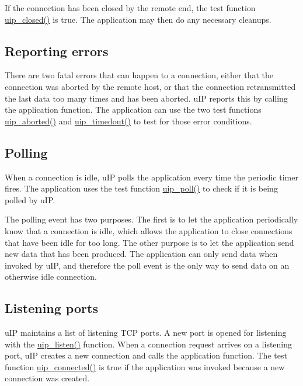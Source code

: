 If the connection has been closed by the remote end, the test function \hyperlink{a00064_gef6c4140c632b6a406779342cf3b6eb6}{uip\_\-closed()} is true. The application may then do any necessary cleanups.\hypertarget{main_errors}{}\subsection{Reporting errors}\label{main_errors}
There are two fatal errors that can happen to a connection, either that the connection was aborted by the remote host, or that the connection retransmitted the last data too many times and has been aborted. u\-IP reports this by calling the application function. The application can use the two test functions \hyperlink{a00064_gfbd5fc486dfdf6bf6fc9db52b1f418c4}{uip\_\-aborted()} and \hyperlink{a00064_g7b2ac4b18bd2ac3912fe67b3b17158c3}{uip\_\-timedout()} to test for those error conditions.\hypertarget{main_polling}{}\subsection{Polling}\label{main_polling}
When a connection is idle, u\-IP polls the application every time the periodic timer fires. The application uses the test function \hyperlink{a00064_g58bb90796c1cdad3aac2ecf44d87b20e}{uip\_\-poll()} to check if it is being polled by u\-IP.

The polling event has two purposes. The first is to let the application periodically know that a connection is idle, which allows the application to close connections that have been idle for too long. The other purpose is to let the application send new data that has been produced. The application can only send data when invoked by u\-IP, and therefore the poll event is the only way to send data on an otherwise idle connection.\hypertarget{main_listen}{}\subsection{Listening ports}\label{main_listen}
u\-IP maintains a list of listening TCP ports. A new port is opened for listening with the \hyperlink{a00064_gdd1ab3704ecd4900eec61a6897d32dc8}{uip\_\-listen()} function. When a connection request arrives on a listening port, u\-IP creates a new connection and calls the application function. The test function \hyperlink{a00064_gdb971fb1525d0c5002f52125b05f3218}{uip\_\-connected()} is true if the application was invoked because a new connection was created.

